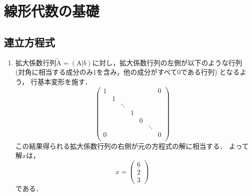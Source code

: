\section{線形代数の基礎}

\subsection{連立方程式\label{linalg:linear_system}}
  \vspace{1mm}
  \begin{enumerate}[label=(\roman*)]
    \item
    拡大係数行列$\tilde{\mathrm{A}} = (\mathrm{A}|b)$に対し，拡大係数行列の左側が以下のような行列
    (対角に相当する成分のみ1を含み，他の成分がすべて0である行列) となるよう，
    行基本変形を施す．
    \begin{equation}
      \left(
        \begin{array}{rrrrrrr}
          1 &   &        &   &   &        & 0 \\
            & 1 &        &   &   &        &   \\
            &   & \ddots &   &   &        &   \\
            &   &        & 1 &   &        &   \\
            &   &        &   & 0 &        &   \\
            &   &        &   &   & \ddots &   \\
          0 &   &        &   &   &        & 0 \\
        \end{array}
      \right)
    \end{equation}
    この結果得られる拡大係数行列の右側が元の方程式の解に相当する．
    よって解$x$は，
    \begin{equation}
      x = \left(
        \begin{array}{r}
          6 \\ 2 \\ 3
        \end{array}
        \right)
    \end{equation}
    である．
    

\end{enumerate}
